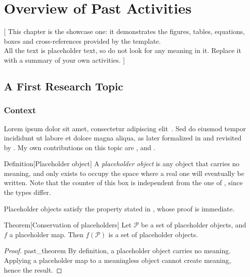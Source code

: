 \chapter[past]{Overview of Past Activities}
 [
  This chapter is the showcase one: it demonstrates the figures, tables, equations, boxes and cross-references provided by the template. \\
  All the text is placeholder text, so do not look for any meaning in it. Replace it with a summary of your own activities.
 ]

\section[past_topic]{A First Research Topic}

\subsection[past_topic_context]{Context}

Lorem ipsum dolor sit amet, consectetur adipiscing elit~\cite{ipsum1998foundational}.
Sed do eiusmod tempor incididunt ut labore et dolore magna aliqua, as later formalized in \cite{tempor2009textbook} and revisited by \cite{amet2017seminal}.
My own contributions on this topic are \cite{lastname2015thesis}, \cite{lastname2021journal} and \cite{lastname2022conference}.

\begin{boxenv}{Definition}[Placeholder object]
    A \emph{placeholder object} is any object that carries no meaning, and only exists to occupy the space where a real one will eventually be written.
    Note that the counter of this box is independent from the one of , since the types differ.
\end{boxenv}

Placeholder objects satisfy the property stated in , whose proof is immediate.

\begin{boxenv}{Theorem}[Conservation of placeholders]
    Let $\mathcal{P}$ be a set of placeholder objects, and $f$ a placeholder map.
    Then $f(\mathcal{P})$ is a set of placeholder objects.
\end{boxenv}

\begin{proof}{past_theorem}
    By definition, a placeholder object carries no meaning.
    Applying a placeholder map to a meaningless object cannot create meaning, hence the result.
\end{proof}

